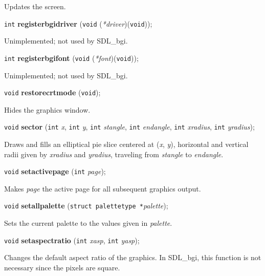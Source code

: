 \documentclass[a4paper,11pt]{article}
\newcommand{\SDLbgi}{SDL\_bgi}
\newcommand{\V}{\texttt{void}}      %
\newcommand{\I}{\texttt{int}}       %
\newcommand{\func}[1]{\textbf{#1}}  %
\newcommand{\A}[1]{\emph{#1}}       %
\newenvironment{bgi}
{ %
  \begin{snugshade}
}
{ %
  \end{snugshade}
}
\begin{document}
Updates the screen.


\begin{bgi}
\I{} \func{registerbgidriver} (\V{} (\A{*driver})(\V{})); 
\end{bgi}

Unimplemented; not used by \SDLbgi.


\begin{bgi}
\I{} \func{registerbgifont} (\V{} (\A{*font})(\V{})); 
\end{bgi}

Unimplemented; not used by \SDLbgi.


\begin{bgi}
\V{} \func{restorecrtmode} (\V{}); 
\end{bgi}

Hides the graphics window.


\begin{bgi}
\V{} \func{sector} (\I{} \A{x}, \I{} \A{y}, \I{} \A{stangle}, \I{}
\A{endangle}, \I{} \A{xradius}, \I{} \A{yradius});
\end{bgi}

Draws and fills an elliptical pie slice centered at (\A{x}, \A{y}),
horizontal and vertical radii given by \A{xradius} and \A{yradius},
traveling from \A{stangle} to \A{endangle}.


\begin{bgi}
\V{} \func{setactivepage} (\I{} \A{page});
\end{bgi}

Makes \A{page} the active page for all subsequent graphics output.


\begin{bgi}
\V{} \func{setallpalette} (\texttt{struct palettetype *}\A{palette}); 
\end{bgi}

Sets the current palette to the values given in \A{palette}.


\begin{bgi}
\V{} \func{setaspectratio} (\I{} \A{xasp}, \I{} \A{yasp});
\end{bgi}

Changes the default aspect ratio of the graphics. In \SDLbgi, this
function is not necessary since the pixels are square.
\end{document}
